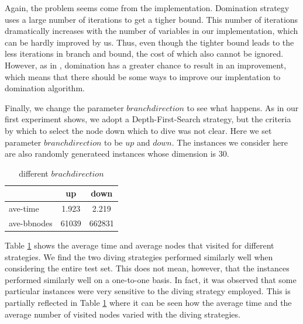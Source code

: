 \documentclass[a4paper,11pt]{article}
\begin{document}
Again, the problem seems come from the implementation. Domination strategy uses a large number of iterations to get a tigher bound. This number of iterations dramatically increases with the number of variables in our implementation, which can be hardly improved by us. Thus, even though the tighter bound leads to the less iterations in branch and bound, the cost of which also cannot be ignored. However, as in \cite{fukasawa2011exact}, domination has a greater chance to result in an improvement, which means that there should be some ways to improve our implentation to domination algorithm.

Finally, we change the parameter $branch direction$ to see what happens. As in our first experiment shows, we adopt a Depth-First-Search strategy, but the criteria by which to select the node down which to dive was not clear. Here we set parameter $branch direction$ to be $up$ and $down$. The instances we consider here are also randomly generateed instances whose dimension is 30. 

\begin{table}[H]
\begin{center}
\begin{tabular}{l c c }
\hline
 & up & down\\
\hline
ave-time&1.923 & 2.219\\
ave-bbnodes& 61039& 662831\\
\hline
\end{tabular}
\end{center}
\caption{different $brach direction$\label{t5}}
\end{table}

Table \ref{t5} shows the average time and average nodes that visited for different strategies. We find the two diving strategies performed similarly well when considering the entire test set. This does not mean, however, that the instances performed similarly well on a one-to-one basis. In fact, it was observed that some particular instances were very sensitive to the diving strategy employed. This is partially reflected in Table \ref{t5} where it can be seen how the average time and the average number of visited nodes varied with the diving strategies.
\end{document}
